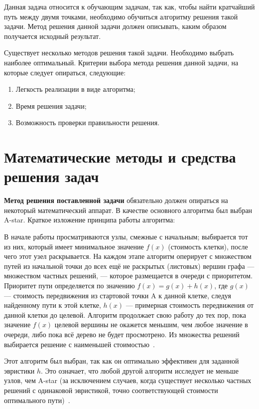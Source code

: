\documentclass[12pt,chapterprefix=true,headings=onelineappendix]{scrartcl}
\begin{document}
Данная задача относится к обучающим задачам, так как, чтобы найти кратчайший
путь между двумя точками, необходимо обучиться алгоритму решения такой задачи.
Метод решения данной задачи должен описывать, каким образом получается исходный
результат.

Существует несколько методов решения такой задачи. Необходимо выбрать
наиболее оптимальный. Критерии выбора метода решения данной задачи, на
которые следует опираться, следующие:
\begin{enumerate}
	\item Легкость реализации в виде алгоритма;
	\item Время решения задачи;
	\item Возможность проверки правильности решения.
\end{enumerate}

\newpage{}
\section{Математические методы и средства решения задач}

\textbf{Метод решения поставленной задачи} обязательно должен опираться на
некоторый математический аппарат. В качестве основного алгоритма был выбран A-star.
Краткое изложение принципа работы алгоритма:

\begin{displayquote}
	В начале работы просматриваются узлы, смежные с начальным; выбирается тот из
	них, который имеет минимальное значение $f(x)$ (стоимость клетки), после чего
	этот узел раскрывается. На каждом этапе алгоритм оперирует с множеством путей
	из начальной точки до всех ещё не раскрытых (листовых) вершин графа —
	множеством частных решений, — которое размещается в очереди с приоритетом.
	Приоритет пути определяется по значению $f(x) = g(x) + h(x)$, где $g(x)$ ---
	стоимость передвижения из стартовой точки A к данной клетке, следуя
	найденному пути к этой клетке, $h(x)$ --- примерная стоимость передвижения от
	данной клетки до целевой. Алгоритм продолжает свою работу до тех пор, пока
	значение $f(x)$ целевой вершины не окажется меньшим, чем любое значение в
	очереди, либо пока всё дерево не будет просмотрено. Из множества решений
	выбирается решение с наименьшей стоимостью~\cite{ЖанЛуи1991,Рассел2006}.
\end{displayquote}

Этот алгоритм был выбран, так как он оптимально эффективен для заданной
эвристики $h$. Это означает, что любой другой алгоритм исследует не меньше
узлов, чем A-star (за исключением случаев, когда существует несколько частных
решений с одинаковой эвристикой, точно соответствующей стоимости оптимального
пути)~\cite{Wikipedia:A-star}.
\end{document}

